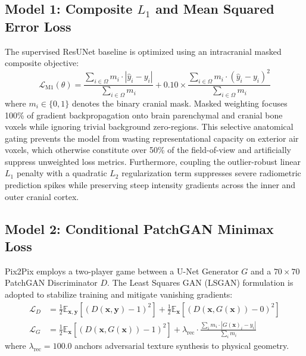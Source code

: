 \subsection{Model 1: Composite $L_1$ and Mean Squared Error Loss}
The supervised ResUNet baseline is optimized using an intracranial masked composite objective:
\begin{equation}
\mathcal{L}_{\text{M1}}(\theta) = \frac{\sum_{i \in \Omega} m_i \cdot |\hat{y}_i - y_i|}{\sum_{i \in \Omega} m_i} + 0.10 \times \frac{\sum_{i \in \Omega} m_i \cdot (\hat{y}_i - y_i)^2}{\sum_{i \in \Omega} m_i}
\label{eq:impl_m1_loss}
\end{equation}
where $m_i \in \{0, 1\}$ denotes the binary cranial mask. Masked weighting focuses 100\% of gradient backpropagation onto brain parenchymal and cranial bone voxels while ignoring trivial background zero-regions. This selective anatomical gating prevents the model from wasting representational capacity on exterior air voxels, which otherwise constitute over 50\% of the field-of-view and artificially suppress unweighted loss metrics. Furthermore, coupling the outlier-robust linear $L_1$ penalty with a quadratic $L_2$ regularization term suppresses severe radiometric prediction spikes while preserving steep intensity gradients across the inner and outer cranial cortex.

\subsection{Model 2: Conditional PatchGAN Minimax Loss}
Pix2Pix employs a two-player game between a U-Net Generator $G$ and a $70 \times 70$ PatchGAN Discriminator $D$. The Least Squares GAN (LSGAN) formulation is adopted to stabilize training and mitigate vanishing gradients:
\begin{align}
\mathcal{L}_D &= \frac{1}{2} \mathbb{E}_{\mathbf{x}, \mathbf{y}}\left[ (D(\mathbf{x}, \mathbf{y}) - 1)^2 \right] + \frac{1}{2} \mathbb{E}_{\mathbf{x}}\left[ (D(\mathbf{x}, G(\mathbf{x})) - 0)^2 \right] \label{eq:impl_d_loss} \\
\mathcal{L}_G &= \frac{1}{2} \mathbb{E}_{\mathbf{x}}\left[ (D(\mathbf{x}, G(\mathbf{x})) - 1)^2 \right] + \lambda_{\text{rec}} \cdot \frac{\sum_{i} m_i \cdot |G(\mathbf{x})_i - y_i|}{\sum_i m_i} \label{eq:impl_g_loss}
\end{align}
where $\lambda_{\text{rec}} = 100.0$ anchors adversarial texture synthesis to physical geometry.

